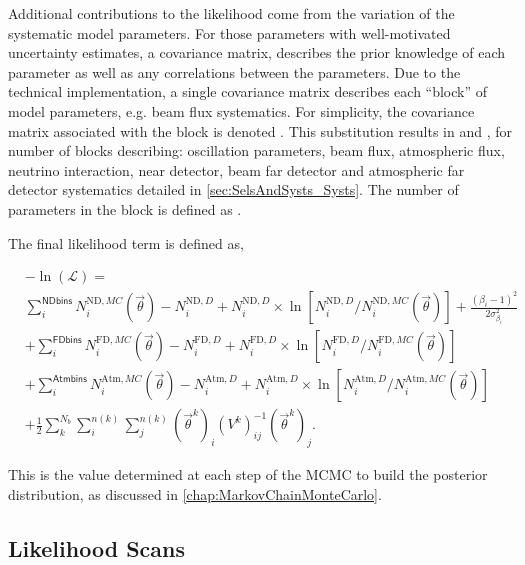 Additional contributions to the likelihood come from the variation of the systematic model parameters. For those parameters with well-motivated uncertainty estimates, a covariance matrix,  describes the prior knowledge of each parameter as well as any correlations between the parameters. Due to the technical implementation, a single covariance matrix describes each ``block'' of model parameters, e.g. beam flux systematics. For simplicity, the covariance matrix associated with the  block is denoted . This substitution results in  and , for  number of blocks describing: oscillation parameters, beam flux, atmospheric flux, neutrino interaction, near detector, beam far detector and atmospheric far detector systematics detailed in \autoref{sec:SelsAndSysts_Systs}. The number of parameters in the  block is defined as .

The final likelihood term is defined as,

\begin{align}
\label{eqn:Likelihood:Likelihood}
&-\ln(\mathcal{L}) = \\ 
& \sum_{i}^{\mathsf{ND bins}} N_{i}^{\mathrm{ND},MC}(\vec{\theta}) - N_{i}^{\mathrm{ND},D} + N_{i}^{\mathrm{ND},D}  \times \ln \left[ N_{i}^{\mathrm{ND},D}/N_{i}^{\mathrm{ND},MC}(\vec{\theta}) \right] + \frac{(\beta_{i}-1)^{2}}{2\sigma^{2}_{\beta_{i}}} \nonumber \\
& +  \sum_{i}^{\mathsf{FD bins}} N_{i}^{\mathrm{FD},MC}(\vec{\theta}) - N_{i}^{\mathrm{FD},D} + N_{i}^{\mathrm{FD},D}  \times \ln \left[ N_{i}^{\mathrm{FD},D}/N_{i}^{\mathrm{FD},MC}(\vec{\theta}) \right] \nonumber \\ 
& +  \sum_{i}^{\mathsf{Atm bins}} N_{i}^{\mathrm{Atm},MC}( \vec{\theta}) - N_{i}^{\mathrm{Atm},D} + N_{i}^{\mathrm{Atm},D} \times  \ln \left[ N_{i}^{\mathrm{Atm},D}/N_{i}^{\mathrm{Atm},MC}(\vec{\theta}) \right] \nonumber \\ 
& + \frac{1}{2} \sum_{k}^{N_{b}} \sum_{i}^{n(k)} \sum_{j}^{n(k)} (\vec{\theta}^{k})_{i} (V^{k})^{-1}_{ij} (\vec{\theta}^{k})_{j}. \nonumber
\end{align}

This is the value determined at each step of the MCMC to build the posterior distribution, as discussed in \autoref{chap:MarkovChainMonteCarlo}.

\subsection{Likelihood Scans}
\label{sec:OscillationAnalysis_LLHScans}


